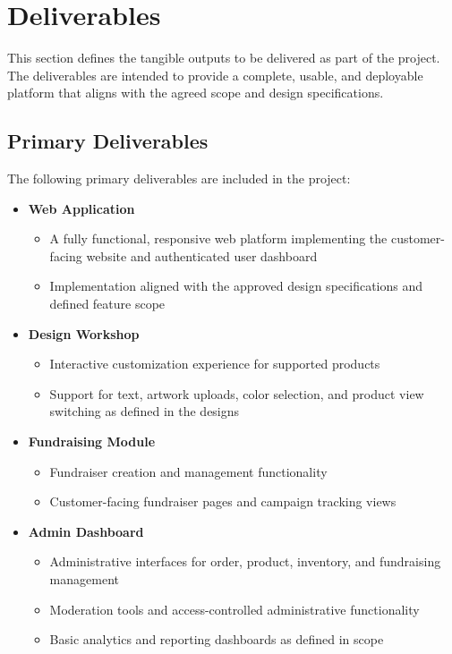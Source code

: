 \section{Deliverables}

This section defines the tangible outputs to be delivered as part of the project.
The deliverables are intended to provide a complete, usable, and deployable
platform that aligns with the agreed scope and design specifications.

\subsection{Primary Deliverables}

The following primary deliverables are included in the project:

\begin{itemize}[leftmargin=1.5em]
    \item \textbf{Web Application}
    \begin{itemize}
        \item A fully functional, responsive web platform implementing the
        customer-facing website and authenticated user dashboard
        \item Implementation aligned with the approved design specifications
        and defined feature scope
    \end{itemize}

    \item \textbf{Design Workshop}
    \begin{itemize}
        \item Interactive customization experience for supported products
        \item Support for text, artwork uploads, color selection, and product
        view switching as defined in the designs
    \end{itemize}

    \item \textbf{Fundraising Module}
    \begin{itemize}
        \item Fundraiser creation and management functionality
        \item Customer-facing fundraiser pages and campaign tracking views
    \end{itemize}

    \item \textbf{Admin Dashboard}
    \begin{itemize}
        \item Administrative interfaces for order, product, inventory, and
        fundraising management
        \item Moderation tools and access-controlled administrative functionality
        \item Basic analytics and reporting dashboards as defined in scope
    \end{itemize}
\end{itemize}

